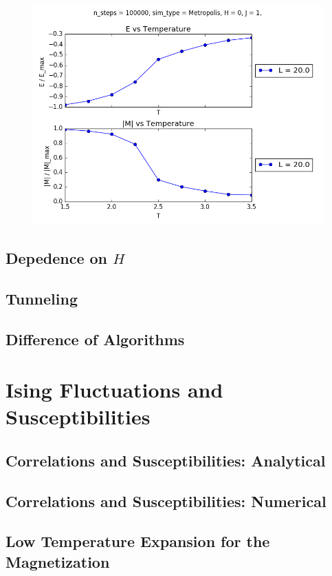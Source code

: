 \documentclass[a4paper,11pt]{article}
\begin{document}
        \begin{figure}[H]
            \centering
            \includegraphics[width=.75\textwidth]{Graphs/Find_Tc_slice_2_good.png}
            \caption{}
        \end{figure}



    \subsection{Depedence on $H$}

    \subsection{Tunneling}

    \subsection{Difference of Algorithms}


\section{Ising Fluctuations and Susceptibilities}

    \subsection{Correlations and Susceptibilities: Analytical}

    \subsection{Correlations and Susceptibilities: Numerical}

    \subsection{Low Temperature Expansion for the Magnetization}
\end{document}
